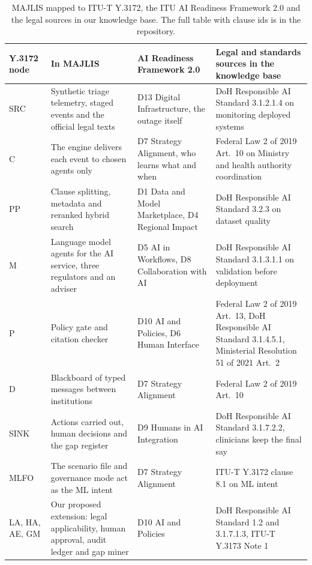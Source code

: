 \documentclass[10pt,twocolumn]{article}
\begin{document}
\begin{table}[t]
\centering\footnotesize
\begin{tabularx}{\textwidth}{@{}p{1.4cm}LLL@{}}
\toprule
\textbf{Y.3172 node} & \textbf{In MAJLIS} & \textbf{AI Readiness Framework 2.0} & \textbf{Legal and standards sources in the knowledge base}\\
\midrule
SRC & Synthetic triage telemetry, staged events and the official legal texts & D13 Digital Infrastructure, the outage itself & DoH Responsible AI Standard 3.1.2.1.4 on monitoring deployed systems\\
C & The engine delivers each event to chosen agents only & D7 Strategy Alignment, who learns what and when & Federal Law 2 of 2019 Art.~10 on Ministry and health authority coordination\\
PP & Clause splitting, metadata and reranked hybrid search & D1 Data and Model Marketplace, D4 Regional Impact & DoH Responsible AI Standard 3.2.3 on dataset quality\\
M & Language model agents for the AI service, three regulators and an adviser & D5 AI in Workflows, D8 Collaboration with AI & DoH Responsible AI Standard 3.1.3.1.1 on validation before deployment\\
P & Policy gate and citation checker & D10 AI and Policies, D6 Human Interface & Federal Law 2 of 2019 Art.~13, DoH Responsible AI Standard 3.1.4.5.1, Ministerial Resolution 51 of 2021 Art.~2\\
D & Blackboard of typed messages between institutions & D7 Strategy Alignment & Federal Law 2 of 2019 Art.~10\\
SINK & Actions carried out, human decisions and the gap register & D9 Humans in AI Integration & DoH Responsible AI Standard 3.1.7.2.2, clinicians keep the final say\\
MLFO & The scenario file and governance mode act as the ML intent & D7 Strategy Alignment & ITU\mbox{-}T Y.3172 clause 8.1 on ML intent\\
LA, HA, AE, GM & Our proposed extension: legal applicability, human approval, audit ledger and gap miner & D10 AI and Policies & DoH Responsible AI Standard 1.2 and 3.1.7.1.3, ITU\mbox{-}T Y.3173 Note 1\\
\bottomrule
\end{tabularx}
\caption{MAJLIS mapped to ITU\mbox{-}T Y.3172, the ITU AI Readiness Framework 2.0 and the legal sources in our knowledge base. The full table with clause ids is in the repository.}
\label{tab:map}
\end{table}
\end{document}
